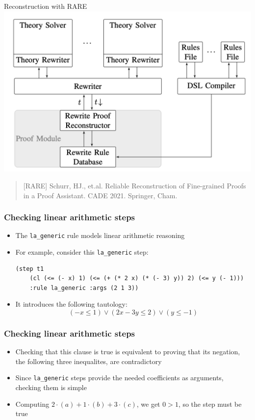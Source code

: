 \documentclass[aspectratio=169,xcolor={dvipsnames}]{beamer}
\newcommand\chighlight[2]{\setlength{\fboxsep}{0pt}\colorbox{#1}{#2\strut}}
\begin{document}
\begin{frame}{Reconstruction with RARE}
\centering
\includegraphics[scale=0.3]{RARE.png}
\vfill
\begin{quote}[RARE]
Schurr, HJ., et.al. Reliable Reconstruction of Fine-grained Proofs in a Proof Assistant. CADE 2021. Springer, Cham.
\end{quote}
\end{frame}

\begin{frame}[fragile]
\frametitle{Checking linear arithmetic steps}
\begin{itemize}
\item The \texttt{la\_generic} rule models linear arithmetic reasoning
\item For example, consider this \texttt{la\_generic} step:
\begin{verbatim}
(step t1
    (cl (<= (- x) 1) (<= (+ (* 2 x) (* (- 3) y)) 2) (<= y (- 1)))
    :rule la_generic :args (2 1 3))
\end{verbatim}
\item It introduces the following tautology:
$$(-x \leq 1) \lor (2x - 3y \leq 2) \lor (y \leq -1)$$
\end{itemize}
\end{frame}

\begin{frame}[fragile]
\frametitle{Checking linear arithmetic steps}
\begin{itemize}
\begin{verbatim}
(step t1
    (cl (<= (- x) 1) (<= (+ (* 2 x) (* (- 3) y)) 2) (<= y (- 1)))
    :rule la_generic |\chighlight{yellow!60}{:args (2 1 3}|))
\end{verbatim}
\item Checking that this clause is true is equivalent to proving that its
negation, the following three inequalites, are contradictory
\item Since \texttt{la\_generic} steps provide the needed coefficients as
    arguments, checking them is simple
\item Computing $2 \cdot (a) + 1 \cdot (b) + 3 \cdot (c)$, we get $0 > 1$,
    so the step must be true
\end{itemize}
\end{frame}
\end{document}
